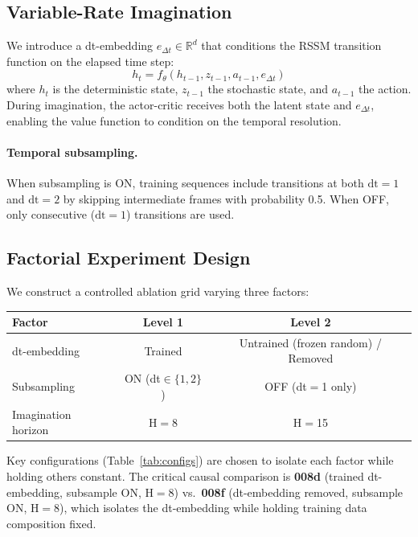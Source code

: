 \documentclass[letterpaper]{article}
\begin{document}
\subsection{Variable-Rate Imagination}

We introduce a dt-embedding $e_{\Delta t} \in \mathbb{R}^d$ that conditions the RSSM transition function on the elapsed time step:
\begin{equation}
    h_t = f_\theta(h_{t-1}, z_{t-1}, a_{t-1}, e_{\Delta t})
\end{equation}
where $h_t$ is the deterministic state, $z_{t-1}$ the stochastic state, and $a_{t-1}$ the action.
During imagination, the actor-critic receives both the latent state and $e_{\Delta t}$, enabling the value function to condition on the temporal resolution.

\paragraph{Temporal subsampling.}
When subsampling is ON, training sequences include transitions at both $\text{dt}=1$ and $\text{dt}=2$ by skipping intermediate frames with probability 0.5.
When OFF, only consecutive ($\text{dt}=1$) transitions are used.

\subsection{Factorial Experiment Design}

We construct a controlled ablation grid varying three factors:

\begin{center}
\begin{tabular}{lcc}
\toprule
\textbf{Factor} & \textbf{Level 1} & \textbf{Level 2} \\
\midrule
dt-embedding & Trained & Untrained (frozen random) / Removed \\
Subsampling & ON (dt$\in\{1,2\}$) & OFF (dt$=$1 only) \\
Imagination horizon & H$=$8 & H$=$15 \\
\bottomrule
\end{tabular}
\end{center}

Key configurations (Table~\ref{tab:configs}) are chosen to isolate each factor while holding others constant.
The critical causal comparison is \textbf{008d} (trained dt-embedding, subsample ON, H$=$8) vs.\ \textbf{008f} (dt-embedding removed, subsample ON, H$=$8), which isolates the dt-embedding while holding training data composition fixed.
\end{document}
